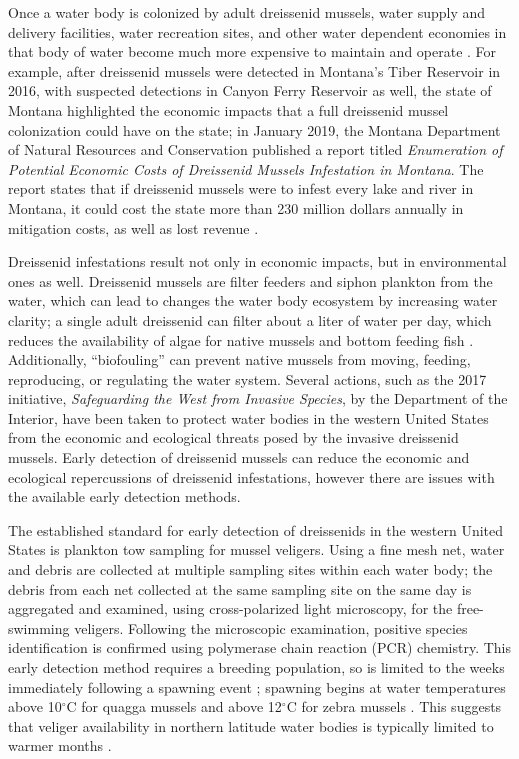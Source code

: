\documentclass[12pt]{article}\usepackage[]{graphicx}\usepackage[]{color}
\begin{document}
Once a water body is colonized by adult dreissenid mussels, water supply and delivery facilities, water recreation sites, and other water dependent economies in that body of water become much more expensive to maintain and operate \cite{BOR}. For example, after dreissenid mussels were detected in Montana's Tiber Reservoir in 2016, with suspected detections in Canyon Ferry Reservoir as well, the state of Montana highlighted the economic impacts that a full dreissenid mussel colonization could have on the state; in January 2019, the Montana Department of Natural Resources and Conservation published a report titled \textit{Enumeration of Potential Economic Costs of Dreissenid Mussels Infestation in Montana}. The report states that if dreissenid mussels were to infest every lake and river in Montana, it could cost the state more than 230 million dollars annually in mitigation costs, as well as lost revenue \cite{MT}. 

Dreissenid infestations result not only in economic impacts, but in environmental ones as well. Dreissenid mussels are filter feeders and siphon plankton from the water, which can lead to changes the water body ecosystem by increasing water clarity; a single adult dreissenid can filter about a liter of water per day, which reduces the availability of algae for native mussels and bottom feeding fish \cite{BOR}. Additionally, ``biofouling'' can prevent native mussels from moving, feeding, reproducing, or regulating the water system. Several actions, such as the 2017 initiative, \textit{Safeguarding the West from Invasive Species}, by the Department of the Interior, have been taken to protect water bodies in the western United States from the economic and ecological threats posed by the invasive dreissenid mussels. Early detection of dreissenid mussels can reduce the economic and ecological repercussions of dreissenid infestations, however there are issues with the available early detection methods. 

The established standard for early detection of dreissenids in the western United States is plankton tow sampling for mussel veligers. Using a fine mesh net, water and debris are collected at multiple sampling sites within each water body; the debris from each net collected at the same sampling site on the same day is aggregated and examined, using cross-polarized light microscopy, for the free-swimming veligers. Following the microscopic examination, positive species identification is confirmed using polymerase chain reaction (PCR) chemistry. This early detection method requires a breeding population, so is limited to the weeks immediately following a spawning event \cite{Nichols}; spawning begins at water temperatures above 10$^\circ$C for quagga mussels and above 12$^\circ$C for zebra mussels \cite{McMahon, Mills}. This suggests that veliger availability in northern latitude water bodies is typically limited to warmer months \cite{Sepulveda:eDNA}.
\end{document}
